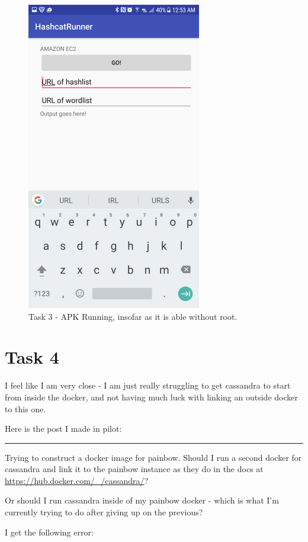 \documentclass{article}
\begin{document}
	\begin{figure}[ht]
        \centerline{
            \includegraphics[width=3in]{img/t3s1.png}
        }
		\centering
		\caption{Task 3 - APK Running, insofar as it is able without root.}
	\end{figure}
	\clearpage


\section{Task 4}
I feel like I am very close - I am just really struggling to get cassandra to start from inside the docker, and not having much luck with linking an outside docker to this one.

Here is the post I made in pilot:
\hrule

Trying to construct a docker image for painbow. Should I run a second docker for cassandra and link it to the painbow instance as they do in the docs at \url{https://hub.docker.com/_/cassandra/}?

Or should I run cassandra inside of my painbow docker - which is what I'm currently trying to do after giving up on the previous?

I get the following error:
\end{document}
